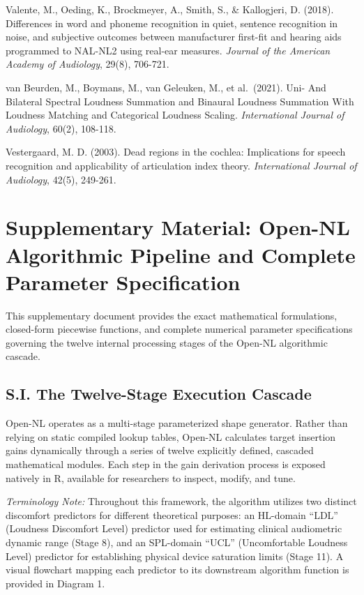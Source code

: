 \documentclass[
  12pt,
]{article}
\begin{document}
Valente, M., Oeding, K., Brockmeyer, A., Smith, S., \& Kallogjeri, D.
(2018). Differences in word and phoneme recognition in quiet, sentence
recognition in noise, and subjective outcomes between manufacturer
first-fit and hearing aids programmed to NAL-NL2 using real-ear
measures. \emph{Journal of the American Academy of Audiology}, 29(8),
706-721.

van Beurden, M., Boymans, M., van Geleuken, M., et al.~(2021). Uni- And
Bilateral Spectral Loudness Summation and Binaural Loudness Summation
With Loudness Matching and Categorical Loudness Scaling.
\emph{International Journal of Audiology}, 60(2), 108-118.

Vestergaard, M. D. (2003). Dead regions in the cochlea: Implications for
speech recognition and applicability of articulation index theory.
\emph{International Journal of Audiology}, 42(5), 249-261.

\section{Supplementary Material: Open-NL Algorithmic Pipeline and
Complete Parameter
Specification}\label{supplementary-material-open-nl-algorithmic-pipeline-and-complete-parameter-specification}

This supplementary document provides the exact mathematical
formulations, closed-form piecewise functions, and complete numerical
parameter specifications governing the twelve internal processing stages
of the Open-NL algorithmic cascade.

\subsection{S.I. The Twelve-Stage Execution
Cascade}\label{s.i.-the-twelve-stage-execution-cascade}

Open-NL operates as a multi-stage parameterized shape generator. Rather
than relying on static compiled lookup tables, Open-NL calculates target
insertion gains dynamically through a series of twelve explicitly
defined, cascaded mathematical modules. Each step in the gain derivation
process is exposed natively in R, available for researchers to inspect,
modify, and tune.

\emph{Terminology Note:} Throughout this framework, the algorithm
utilizes two distinct discomfort predictors for different theoretical
purposes: an HL-domain ``LDL'' (Loudness Discomfort Level) predictor
used for estimating clinical audiometric dynamic range (Stage 8), and an
SPL-domain ``UCL'' (Uncomfortable Loudness Level) predictor for
establishing physical device saturation limits (Stage 11). A visual
flowchart mapping each predictor to its downstream algorithm function is
provided in Diagram 1.
\end{document}
